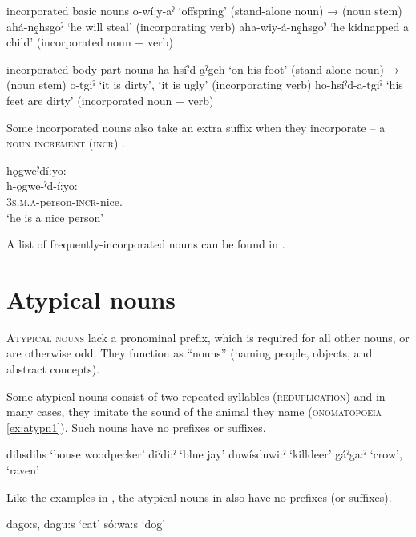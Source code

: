 \ea\label{ex:incnnex1} incorporated basic nouns
\ea o-wí:y-aˀ ‘offspring’ (stand-alone noun) →  (noun stem)
\ex ahá-nę̱hsgoˀ ‘he will steal’ (incorporating verb)
\ex aha-wiy-á-nę̱hsgoˀ ‘he kidnapped a child’ (incorporated noun + verb)
\z
\z

\ea\label{ex:incnnex2}incorporated body part nouns
\ea ha-hsíˀd-a̱ˀgeh ‘on his foot’ (stand-alone noun) →  (noun stem)\label{ex:incnnex2a}
\ex o-tgiˀ ‘it is dirty’, ‘it is ugly’ (incorporating verb)\label{ex:incnnex2b}
\ex ho-hsíˀd-a-tgiˀ ‘his feet are dirty’ (incorporated noun + verb)\label{ex:incnnex2c}
\z
\z

Some incorporated nouns also take an extra suffix when they incorporate -- a \textsc{noun increment} (\textsc{incr}) .


\ea\label{ex:nounincrement}
 hǫgweˀdí:yo:\\
\gll h-ǫgwe-ˀd-í:yo:\\
\textsc{3s.m.a}-person-\textsc{incr}-nice.{\stative}\\
\glt `he is a nice person'
\z

A list of frequently-incorporated nouns can be found in .

\section{Atypical nouns} \label{ch:Atypical nouns}
\textsc{Atypical nouns} lack a pronominal prefix, which is required for all other nouns, or are otherwise odd. They function as “nouns” (naming people, objects, and abstract concepts).

Some atypical nouns consist of two repeated syllables (\textsc{reduplication}) and in many cases, they imitate the sound of the animal they name (\textsc{onomatopoeia} \ref{ex:atypn1}). Such nouns have no prefixes or suffixes.

\newpage
\ea\label{ex:atypn1}
\ea dihsdihs ‘house woodpecker’
\ex diˀdi:ˀ ‘blue jay’
\ex duwísduwi:ˀ ‘killdeer’
\ex gáˀga:ˀ ‘crow’, ‘raven’
\z
\z

Like the examples in , the atypical nouns in  also have no prefixes (or suffixes).

\ea\label{ex:atypn2}
\ea dago:s, dagu:s ‘cat’
\ex só:wa:s ‘dog’
\z
\z

